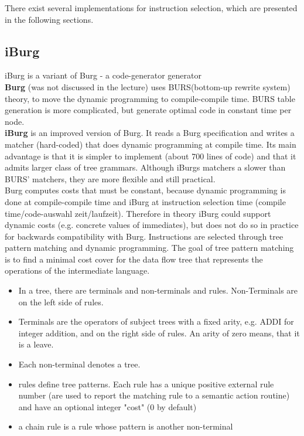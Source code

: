 \documentclass[a4paper,10pt]{article}
\begin{document}
There exist several implementations for instruction selection, which are presented in the following sections.
\subsection{iBurg}

iBurg is a variant of Burg - a code-generator generator\\

\textbf{Burg} (was not discussed in the lecture) uses BURS(bottom-up rewrite system) theory, to move the dynamic programming to compile-compile time. BURS table generation is more complicated, but generate optimal code in constant time per node.\\

\textbf{iBurg} is an improved version of Burg. It reads a Burg specification and writes a matcher (hard-coded) that does dynamic programming at compile time. Its main advantage is that it is simpler to implement (about 700 lines of code) and that it admits larger class of tree grammars. Although iBurgs matchers a slower than BURS' matchers, they are more flexible and still practical.\\

Burg computes costs that must be constant, because dynamic programming is done at compile-compile time and iBurg at instruction selection time (compile time/code-auswahl zeit/laufzeit). Therefore in theory iBurg could support dynamic costs (e.g. concrete values of immediates), but does not do so in practice for backwards compatibility with Burg. Instructions are selected through tree pattern matching and dynamic programming. The goal of tree pattern matching is to find a minimal cost cover for the data flow tree that represents the operations of the intermediate language.\\

\begin{itemize}
	\item In a tree, there are terminals and non-terminals and rules. Non-Terminals are on the left side of rules. 		\item Terminals are the operators of subject trees with a fixed arity, e.g. ADDI for integer addition, and on the right side of rules. An arity of zero means, that it is a leave.
	\item Each non-terminal denotes a tree.
	\item rules define tree patterns. Each rule has a unique positive external rule number (are used to report the matching rule to a semantic action routine) and have an optional integer "cost" (0 by default)
	\item a chain rule is a rule whose pattern is another non-terminal
\end{itemize}
\end{document}
